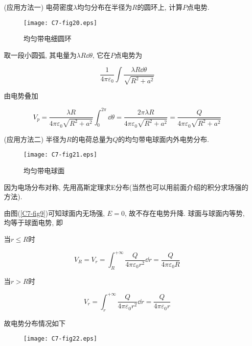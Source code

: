 \begin{example}
	(应用方法一) 电荷密度$\lambda$均匀分布在半径为$R$的圆环上, 计算$P$点电势. 
	
	\begin{figure}[H]
		\centering
		\texttt{[image: C7-fig20.eps]}
		\caption{均匀带电细圆环}
	\end{figure}
	
	\begin{solution}
		
		取一段小圆弧, 其电量为$\lambda R \dd{\theta}$, 它在$P$点电势为
		
		\begin{equation*}
			\dfrac{1}{4\pi\varepsilon_0}\int\dfrac{\lambda R \dd{\theta}}{\sqrt{R^2 + a^2}}
		\end{equation*}
		
		由电势叠加
		
		\begin{equation*}
			V_p = \dfrac{\lambda R}{4\pi\varepsilon_0\sqrt{R^2+a^2}}\int_{0}^{2\pi}\dd{\theta} = \dfrac{2\pi\lambda R}{4\pi\varepsilon_0\sqrt{R^2+a^2}} = \dfrac{Q}{4\pi\varepsilon_0\sqrt{R^2+a^2}}
		\end{equation*}
		
	\end{solution}
	
\end{example}

\begin{example}
	(应用方法二) 半径为$R$的电荷总量为$Q$的均匀带电球面内外电势分布. 
	
	\begin{figure}[H]
		\centering
		\texttt{[image: C7-fig21.eps]}
		\caption{均匀带电球面}
	\end{figure}
	
	\begin{solution}
		
		因为电场分布对称, 先用高斯定理求E分布(当然也可以用前面介绍的积分求场强的方法). 
		
		由图(\ref{C7-fig9})可知球面内无场强, $E = 0$, 故不存在电势升降. 球面与球面内等势, 均等于球面电势, 即
		
		当$r \leq R$时
		
		\begin{equation*}
			V_R = V_r = \int_{R}^{+\infty}{\dfrac{Q}{4\pi\varepsilon_0 r^2}\dd{r}} = \dfrac{Q}{4\pi\varepsilon_0 R} 
		\end{equation*}
		
		当$r > R$时 
		
		\begin{equation*}
			V_r = \int_{r}^{+\infty}{\dfrac{Q}{4\pi\varepsilon_0 r^2}\dd{r}} = \dfrac{Q}{4\pi\varepsilon_0 r}
		\end{equation*}
		
		故电势分布情况如下
		
		\begin{figure}[H]
			\centering
			\texttt{[image: C7-fig22.eps]}
		\end{figure}
		
	\end{solution}
	
\end{example}

